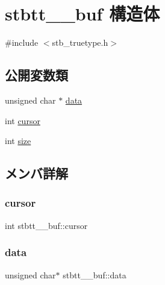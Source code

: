 \hypertarget{structstbtt____buf}{}\section{stbtt\+\_\+\+\_\+buf 構造体}
\label{structstbtt____buf}


{\ttfamily \#include $<$stb\+\_\+truetype.\+h$>$}

\subsection*{公開変数類}
\begin{DoxyCompactItemize}
\item 
unsigned char $\ast$ \mbox{\hyperlink{structstbtt____buf_a376d8cdacbc8295a7e88567ad52a0ac4}{data}}
\item 
int \mbox{\hyperlink{structstbtt____buf_ac047fda650726920531272c28aa354fb}{cursor}}
\item 
int \mbox{\hyperlink{structstbtt____buf_a0f6f2d06981ab4a5697233bbd0cafb5b}{size}}
\end{DoxyCompactItemize}


\subsection{メンバ詳解}
\mbox{\label{structstbtt____buf_ac047fda650726920531272c28aa354fb}} 
\subsubsection{\texorpdfstring{cursor}{cursor}}
{\footnotesize\ttfamily int stbtt\+\_\+\+\_\+buf\+::cursor}

\mbox{\label{structstbtt____buf_a376d8cdacbc8295a7e88567ad52a0ac4}} 
\subsubsection{\texorpdfstring{data}{data}}
{\footnotesize\ttfamily unsigned char$\ast$ stbtt\+\_\+\+\_\+buf\+::data}

\mbox{\label{structstbtt____buf_a0f6f2d06981ab4a5697233bbd0cafb5b}} 
